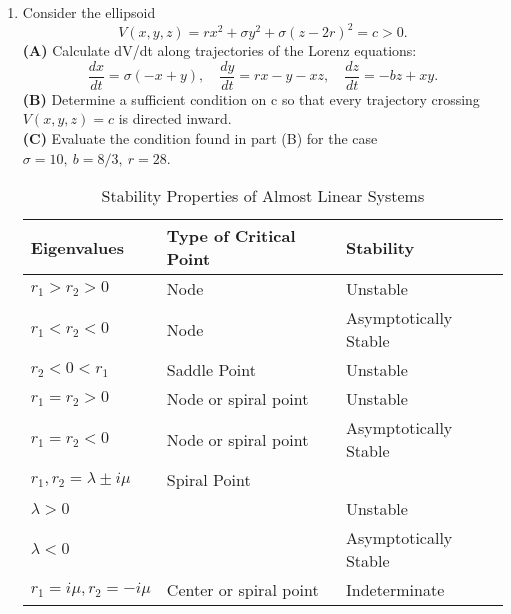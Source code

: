 \documentclass[11pt,a4paper]{article}
\begin{document}
\begin{enumerate}
		\item Consider the ellipsoid
		$$
		V(x,y,z) = rx^2 + \sigma y^2 + \sigma(z-2r)^2 = c > 0.
		$$
		\textbf{(A)} Calculate dV/dt along trajectories of the Lorenz equations:
		$$
		\frac{dx}{dt} = \sigma(-x + y),\quad \frac{dy}{dt} = rx-y-xz,\quad \frac{dz}{dt} = -bz + xy.
		$$
		\textbf{(B)} Determine a sufficient condition on c so that every trajectory crossing $V(x, y, z) = c$ is directed inward.\\
		\textbf{(C)} Evaluate the condition found in part (B) for the case $\sigma = 10,\ b = 8/3,\ r = 28$.
		\begin{table}[H]
			\centering
			\begin{tabular}{ |l|l|l| } 
			 \hline
			 \textbf{Eigenvalues} & \textbf{Type of Critical Point} & \textbf{Stability}\\
			 \hline
			 \hline
			 $r_1>r_2>0$ & Node & Unstable \\
			 \hline
			 $r_1 < r_2 < 0$ & Node & Asymptotically Stable \\
			 \hline
			 $r_2 < 0 < r_1$ & Saddle Point & Unstable \\ 
			 \hline
			 $r_1 = r_2 > 0$ & Node or spiral point & Unstable \\
			 \hline
			 $r_1 = r_2 < 0$ & Node or spiral point & Asymptotically Stable \\
			 \hline
			 $r_1,r_2 = \lambda \pm i\mu$ & Spiral Point &  \\
			 
			 $\lambda > 0$ &  & Unstable \\
			 
			 $\lambda < 0$ &  & Asymptotically Stable \\
			 \hline
			 $r_1 = i\mu, r_2 = -i\mu$ & Center or spiral point & Indeterminate \\
			 \hline
			\end{tabular}
			\caption{Stability Properties of Almost Linear Systems}
		\end{table}
	\end{enumerate}
\end{document}
